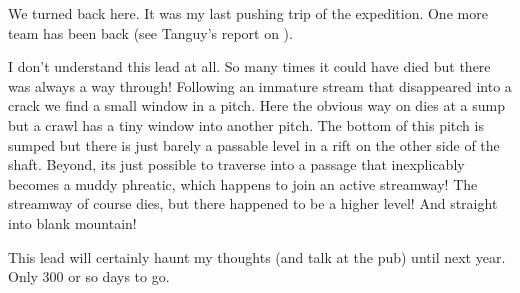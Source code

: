 We turned back here. It was my last pushing trip of the expedition. One more team has been back (see Tanguy’s report on ).
 
I don’t understand this lead at all. So many times it could have died but there was always a way through! Following an immature stream that disappeared into a crack we find a small window in a pitch. Here the obvious way on dies at a sump but a crawl has a tiny window into another pitch. The bottom of this pitch is sumped but there is just barely a passable level in a rift on the other side of the shaft. Beyond, its just possible to traverse into a passage that inexplicably becomes a muddy phreatic, which happens to join an active streamway! The streamway of course dies, but there happened to be a higher level! And straight into blank mountain!
 
This lead will certainly haunt my thoughts (and talk at the pub) until next year. Only 300 or so days to go.

